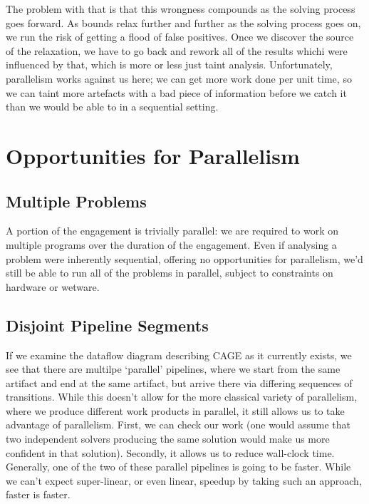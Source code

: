 \documentclass{article}
\begin{document}
  The problem with that is that this wrongness compounds as the solving process
  goes forward.  As bounds relax further and further as the solving process goes
  on, we run the risk of getting a flood of false positives.  Once we discover
  the source of the relaxation, we have to go back and rework all of the results
  whichi were influenced by that, which is more or less just taint analysis.
  Unfortunately, parallelism works against us here; we can get more work done
  per unit time, so we can taint more artefacts with a bad piece of information
  before we catch it than we would be able to in a sequential setting.

\section{Opportunities for Parallelism}

\subsection{Multiple Problems}

A portion of the engagement is trivially parallel: we are required to work on
multiple programs over the duration of the engagement.  Even if analysing a
problem were inherently sequential, offering no opportunities for parallelism,
we'd still be able to run all of the problems in parallel, subject to
constraints on hardware or wetware.

\subsection{Disjoint Pipeline Segments}

If we examine the dataflow diagram describing CAGE as it currently exists, we
see that there are multilpe `parallel' pipelines, where we start from the same
artifact and end at the same artifact, but arrive there via differing sequences
of transitions.  While this doesn't allow for the more classical variety of
parallelism, where we produce different work products in parallel, it still
allows us to take advantage of parallelism. First, we can check our work (one
would assume that two independent solvers producing the same solution would make
us more confident in that solution).  Secondly, it allows us to reduce
wall-clock time.  Generally, one of the two of these parallel pipelines is going
to be faster.  While we can't expect super-linear, or even linear, speedup by
taking such an approach, faster is faster.
\end{document}
